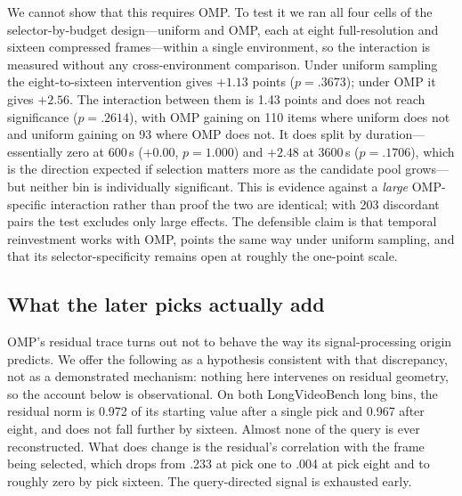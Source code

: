 \documentclass[11pt]{article}
\begin{document}
We cannot show that this requires OMP.
To test it we ran all four cells of the selector-by-budget design---uniform and OMP, each at eight full-resolution and sixteen compressed frames---within a single environment, so the interaction is measured without any cross-environment comparison.
Under uniform sampling the eight-to-sixteen intervention gives ${+}1.13$ points ($p{=}.3673$); under OMP it gives ${+}2.56$.
The interaction between them is 1.43 points and does not reach significance ($p{=}.2614$), with OMP gaining on 110 items where uniform does not and uniform gaining on 93 where OMP does not.
It does split by duration---essentially zero at 600\,s (${+}0.00$, $p{=}1.000$) and ${+}2.48$ at 3600\,s ($p{=}.1706$), which is the direction expected if selection matters more as the candidate pool grows---but neither bin is individually significant.
This is evidence against a \emph{large} OMP-specific interaction rather than proof the two are identical; with 203 discordant pairs the test excludes only large effects.
The defensible claim is that temporal reinvestment works with OMP, points the same way under uniform sampling, and that its selector-specificity remains open at roughly the one-point scale.

\subsection{What the later picks actually add}
\label{sec:mechanism}

OMP's residual trace turns out not to behave the way its signal-processing origin predicts. We offer the following as a hypothesis consistent with that discrepancy, not as a demonstrated mechanism: nothing here intervenes on residual geometry, so the account below is observational.
On both LongVideoBench long bins, the residual norm is 0.972 of its starting value after a single pick and 0.967 after eight, and does not fall further by sixteen.
Almost none of the query is ever reconstructed.
What does change is the residual's correlation with the frame being selected, which drops from .233 at pick one to .004 at pick eight and to roughly zero by pick sixteen.
The query-directed signal is exhausted early.
\end{document}
